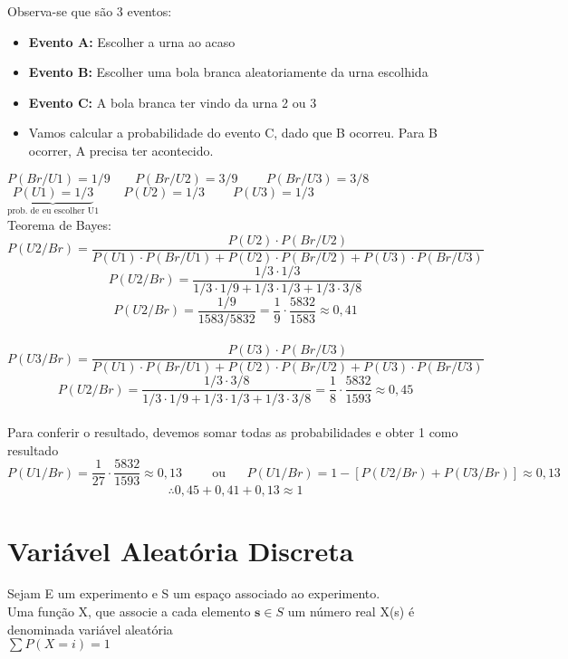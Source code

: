 \documentclass{article}
\begin{document}
{Observa-se que são 3 eventos: 
\begin{itemize}
    \item \textbf{Evento A:} Escolher a urna ao acaso
    \item \textbf{Evento B:} Escolher uma bola branca aleatoriamente da urna escolhida
    \item \textbf{Evento C:} A bola branca ter vindo da urna 2 ou 3
    \item Vamos calcular a probabilidade do evento C, dado que B ocorreu. Para B ocorrer, A precisa ter acontecido.\\
\end{itemize}


$P(Br/U1)=1/9\;\;\;\;\;\;\; P(Br/U2)=3/9\;\;\;\;\;\;\;\;P(Br/U3)=3/8$\\

\noindent$\underbrace{P(U1)=1/3}_{\text{prob. de eu escolher U1}}\;\;\;\;\;\;\; P(U2)=1/3\;\;\;\;\;\;\;\;P(U3)=1/3$\\

Teorema de Bayes:\[P(U2/Br)=\frac{P(U2)\cdot P(Br/U2)}{P(U1)\cdot P(Br/U1)+ P(U2)\cdot P(Br/U2)+P(U3)\cdot P(Br/U3)}\]
\[P(U2/Br)=\frac{1/3\cdot 1/3}{1/3\cdot1/9 + 1/3\cdot 1/3+1/3\cdot 3/8}\]
\[P(U2/Br)= \frac{1/9}{1583/5832}=\frac{1}{9}\cdot \frac{5832}{1583} \approx \boxed{0,41}\]\\

\[P(U3/Br)=\frac{P(U3)\cdot P(Br/U3)}{P(U1)\cdot P(Br/U1)+ P(U2)\cdot P(Br/U2)+P(U3)\cdot P(Br/U3)}\]
\[P(U2/Br)=\frac{1/3\cdot 3/8}{1/3\cdot1/9 + 1/3\cdot 1/3+1/3\cdot 3/8}=\frac{1}{8}\cdot\frac{5832}{1593} \approx \boxed{0,45}\]\\

Para conferir o resultado, devemos somar todas as probabilidades e obter 1 como resultado\\
\[P(U1/Br)=\frac{1}{27}\cdot \frac{5832}{1593} \approx0,13\hspace{1cm}\text{ou}\;\;\;\;\;\; P(U1/Br)=1-[P(U2/Br)+P(U3/Br)]\approx 0,13\]
\[\therefore 0,45 +0,41+0,13 \approx 1\]
\newpage
\section{Variável Aleatória Discreta}
Sejam E um experimento e S um espaço associado ao experimento.\\
Uma função X, que associe a cada elemento $\textbf{s} \in S$ um número real X(s) é denominada variável aleatória\\
$\sum P(X=i)=1$\\

}
\end{document}
